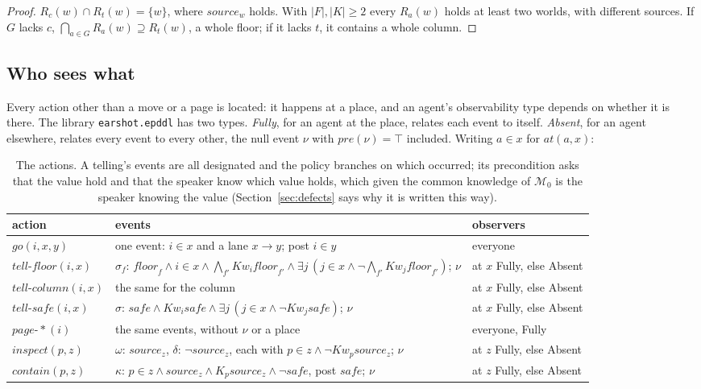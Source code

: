 \documentclass[11pt,a4paper]{article}
\theoremstyle{definition}
\newcommand{\Mod}{\mathcal{M}}
\newcommand{\Kw}[1]{\mathit{Kw}_{#1}}
\newcommand{\code}[1]{\texttt{\small #1}}
\newcommand{\pre}{\mathit{pre}}
\newcommand{\safe}{\mathit{safe}}
\newcommand{\src}[1]{\mathit{source}_{#1}}
\newcommand{\fl}[1]{\mathit{floor}_{#1}}
\newcommand{\at}{\mathit{at}}
\begin{document}
\begin{proof}
$R_c(w) \cap R_t(w) = \{w\}$, where $\src{w}$ holds. With $|F|, |K| \geq 2$ every
$R_a(w)$ holds at least two worlds, with different sources. If $G$ lacks $c$,
$\bigcap_{a \in G} R_a(w) \supseteq R_t(w)$, a whole floor; if it lacks $t$, it
contains a whole column.
\end{proof}

\subsection{Who sees what}

Every action other than a move or a page is located: it happens at a place,
and an agent's observability type depends on whether it is there. The library
\code{earshot.epddl} has two types. \emph{Fully}, for an agent at the place,
relates each event to itself. \emph{Absent}, for an agent elsewhere, relates
every event to every other, the null event $\nu$ with $\pre(\nu) = \top$
included. Writing $a \in x$ for $\at(a, x)$:

\begin{table}[H]
\centering\small
\begin{tabularx}{\textwidth}{@{}l X l@{}}
\toprule
action & events & observers \\
\midrule
$\mathit{go}(i, x, y)$ & one event: $i \in x$ and a lane $x \to y$; post $i \in y$ & everyone \\
$\mathit{tell\text{-}floor}(i, x)$ & $\sigma_f$: $\fl{f} \wedge i \in x \wedge \bigwedge_{f'}\Kw{i}\fl{f'} \wedge \exists j\,(j \in x \wedge \neg\bigwedge_{f'}\Kw{j}\fl{f'})$; $\nu$ & at $x$ Fully, else Absent \\
$\mathit{tell\text{-}column}(i, x)$ & the same for the column & at $x$ Fully, else Absent \\
$\mathit{tell\text{-}safe}(i, x)$ & $\sigma$: $\safe \wedge \Kw{i}\safe \wedge \exists j\,(j \in x \wedge \neg\Kw{j}\safe)$; $\nu$ & at $x$ Fully, else Absent \\
$\mathit{page\text{-}}\ast(i)$ & the same events, without $\nu$ or a place & everyone, Fully \\
$\mathit{inspect}(p, z)$ & $\omega$: $\src{z}$, $\delta$: $\neg\src{z}$, each with $p \in z \wedge \neg\Kw{p}\src{z}$; $\nu$ & at $z$ Fully, else Absent \\
$\mathit{contain}(p, z)$ & $\kappa$: $p \in z \wedge \src{z} \wedge K_p\src{z} \wedge \neg\safe$, post $\safe$; $\nu$ & at $z$ Fully, else Absent \\
\bottomrule
\end{tabularx}
\caption{The actions. A telling's events are all designated and the policy
branches on which occurred; its precondition asks that the value hold and that
the speaker know which value holds, which given the common knowledge of
$\Mod_0$ is the speaker knowing the value (Section~\ref{sec:defects} says why it
is written this way).}
\label{tab:actions}
\end{table}
\end{document}
